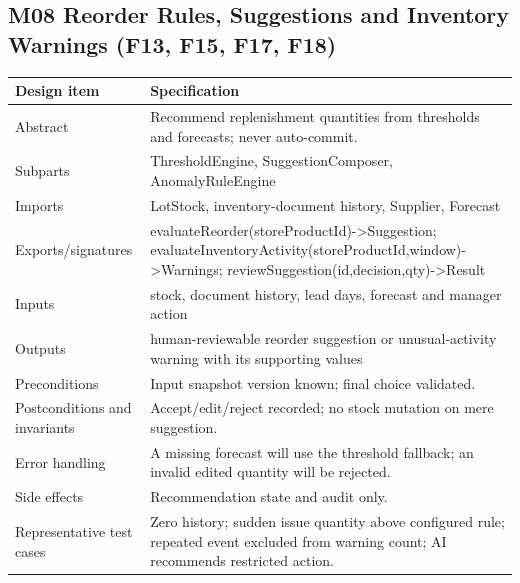 \subsection{M08 Reorder Rules, Suggestions and Inventory Warnings (F13, F15, F17, F18)}\label{m08-reorder-rules-and-suggestions-f13-f17-f18}

{\def\LTcaptype{none} %
\begin{longtable}[]{|
  >{\raggedright\arraybackslash}m{}|
  >{\raggedright\arraybackslash}m{}|}
\hline
\begin{minipage}[c]{\linewidth}\raggedright
\textbf{Design item}
\end{minipage} & \begin{minipage}[c]{\linewidth}\raggedright
\textbf{Specification}
\end{minipage} \\
\hline
\endhead

\endlastfoot
Abstract & Recommend replenishment quantities from thresholds and forecasts; never auto-commit. \\ \hline
Subparts & ThresholdEngine, SuggestionComposer, AnomalyRuleEngine \\ \hline
Imports & LotStock, inventory-document history, Supplier, Forecast \\ \hline
Exports/signatures & evaluateReorder(storeProductId)-\textgreater Suggestion; evaluateInventoryActivity(storeProductId,window)-\textgreater Warnings; reviewSuggestion(id,decision,qty)-\textgreater Result \\ \hline
Inputs & stock, document history, lead days, forecast and manager action \\ \hline
Outputs & human-reviewable reorder suggestion or unusual-activity warning with its supporting values \\ \hline
Preconditions & Input snapshot version known; final choice validated. \\ \hline
Postconditions and invariants & Accept/edit/reject recorded; no stock mutation on mere suggestion. \\ \hline
Error handling & A missing forecast will use the threshold fallback; an invalid edited quantity will be rejected. \\ \hline
Side effects & Recommendation state and audit only. \\ \hline
Representative test cases & Zero history; sudden issue quantity above configured rule; repeated event excluded from warning count; AI recommends restricted action. \\ \hline
\end{longtable}
}

